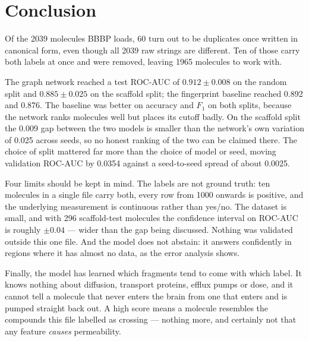 \section*{Conclusion}

Of the 2039 molecules BBBP loads, 60 turn out to be duplicates once written in canonical form, even though all 2039 raw strings are different. Ten of those carry both labels at once and were removed, leaving 1965 molecules to work with.

The graph network reached a test ROC-AUC of $0.912 \pm 0.008$ on the random split and $0.885 \pm 0.025$ on the scaffold split; the fingerprint baseline reached 0.892 and 0.876. The baseline was better on accuracy and $F_1$ on both splits, because the network ranks molecules well but places its cutoff badly. On the scaffold split the 0.009 gap between the two models is smaller than the network's own variation of 0.025 across seeds, so no honest ranking of the two can be claimed there. The choice of split mattered far more than the choice of model or seed, moving validation ROC-AUC by 0.0354 against a seed-to-seed spread of about 0.0025.

Four limits should be kept in mind. The labels are not ground truth: ten molecules in a single file carry both, every row from 1000 onwards is positive, and the underlying measurement is continuous rather than yes/no. The dataset is small, and with 296 scaffold-test molecules the confidence interval on ROC-AUC is roughly $\pm 0.04$ --- wider than the gap being discussed. Nothing was validated outside this one file. And the model does not abstain: it answers confidently in regions where it has almost no data, as the error analysis shows.

Finally, the model has learned which fragments tend to come with which label. It knows nothing about diffusion, transport proteins, efflux pumps or dose, and it cannot tell a molecule that never enters the brain from one that enters and is pumped straight back out. A high score means a molecule resembles the compounds this file labelled as crossing --- nothing more, and certainly not that any feature \emph{causes} permeability.
